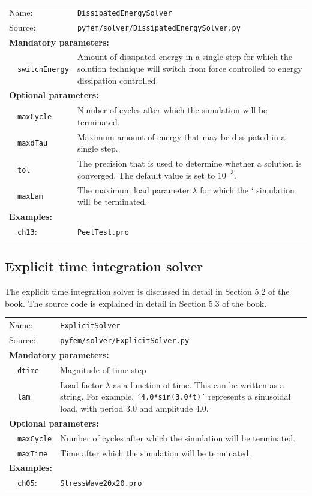 \documentclass{article}
\begin{document}
\vspace{2mm}
\begin{tabular}{p{22mm}p{74mm}}
Name:         & \texttt{DissipatedEnergySolver} \\
Source:  & \texttt{pyfem/solver/DissipatedEnergySolver.py} \\
\multicolumn{2}{l}{\textbf{Mandatory parameters:}} \\
~~\texttt{switchEnergy} & Amount of dissipated energy in a single step for which the solution technique will switch from
                          force controlled to energy dissipation controlled.\\
\multicolumn{2}{l}{\textbf{Optional parameters:}} \\ 
~~\texttt{maxCycle} &  Number of cycles after which the simulation will be terminated.\\
~~\texttt{maxdTau}  &  Maximum amount of energy that may be dissipated in a single step.\\
~~\texttt{tol}      &  The precision that is used to determine whether a solution is converged. The 
                       default value is set to $10^{-3}$.\\
~~\texttt{maxLam}    & The maximum load parameter $\lambda$ for which the
                      ` simulation will be terminated.\\
\multicolumn{2}{l}{\textbf{Examples:}}\\
~~\texttt{ch13}: & \texttt{PeelTest.pro}
\end{tabular}

\subsection{Explicit time integration solver}

The explicit time integration solver is discussed in detail in Section 5.2 of the book. The source code is explained in detail in Section 5.3 of the book.

\vspace{2mm}
\begin{tabular}{p{22mm}p{74mm}}
Name:         & \texttt{ExplicitSolver} \\
Source:  & \texttt{pyfem/solver/ExplicitSolver.py} \\
\multicolumn{2}{l}{\textbf{Mandatory parameters:}} \\
~~\texttt{dtime} & Magnitude of time step\\
~~\texttt{lam}   & Load factor $\lambda$ as a function of time. This can be written
                 as a string. For example, \texttt{'4.0*sin(3.0*t)'} represents a sinusoidal 
                 load, with period 3.0 and amplitude 4.0.	\\
\multicolumn{2}{l}{\textbf{Optional parameters:}} \\ 
~~\texttt{maxCycle} &  Number of cycles after which the simulation will be terminated.\\
~~\texttt{maxTime}  &  Time after which the simulation will be terminated.\\
\multicolumn{2}{l}{\textbf{Examples:}}\\
~~\texttt{ch05}: & \texttt{StressWave20x20.pro}
\end{tabular}
\end{document}
